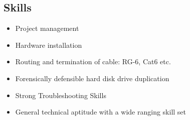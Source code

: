 \documentclass[line,margin]{res}
\begin{document}
\begin{resume}
\section{Skills}
 \begin{itemize} \itemsep -2pt
 \item Project management
 \item Hardware installation
 \item Routing and termination of cable: RG-6, Cat6 etc.  
 \item Forensically defensible hard disk drive duplication
 \item Strong Troubleshooting Skills
 \item General technical aptitude with a wide ranging skill set
 \end{itemize}
					

\end{resume}
\end{document}

